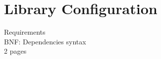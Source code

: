\section{Library Configuration}
\label{ssec:config}

Requirements\\
BNF: Dependencies syntax\\
2 pages

